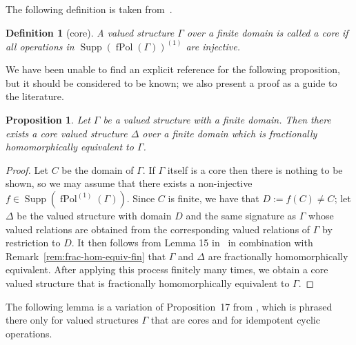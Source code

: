 \documentclass[nonacm]{acmart}
\DeclareMathOperator{\fPol}{fPol}
\DeclareMathOperator{\Sup}{Supp}
\newtheorem{definition}[theorem]{Definition}
\newtheorem{proposition}[theorem]{Proposition}
\begin{document}
The following definition is taken from~\cite{KozikOchremiak15}.
\begin{definition}[core]\label{def:core}
A valued structure $\Gamma$ over a finite domain is called a \emph{core} if all operations in  
$\Sup(\fPol(\Gamma))^{(1)}$ are injective. 
\end{definition}

We have been unable to find an explicit reference for the following proposition, but it should be considered to be known; 
we also present a proof as a guide to the literature. 

\begin{proposition}\label{prop:core}
Let $\Gamma$ be a valued structure with a finite domain. Then there exists a core valued structure $\Delta$ over a finite domain  which is fractionally homomorphically equivalent to $\Gamma$.
\end{proposition}

\begin{proof}
Let $C$ be the domain of $\Gamma$. 
If $\Gamma$ itself is a core then there is nothing to be shown, so we may assume that there exists a non-injective $f \in \Sup(\fPol^{(1)}(\Gamma))$. Since $C$ is finite, we have that $
D := f(C) \neq C$; let $\Delta$ be the valued structure with domain $D$ and the same signature as $\Gamma$ whose valued relations are obtained from the corresponding valued relations of $\Gamma$ by restriction to $D$. 
It then follows from Lemma 15 in~\cite{KozikOchremiak15-arxiv} 
in combination with Remark~\ref{rem:frac-hom-equiv-fin}
that $\Gamma$ and $\Delta$ are fractionally homomorphically equivalent. After applying this process finitely many times, we obtain a core valued structure that is fractionally homomorphically equivalent to $\Gamma$. 
\end{proof}

The following lemma is a variation of Proposition~17 from \cite{KozikOchremiak15}, which is phrased there only for valued structures $\Gamma$ that are cores 
and for idempotent cyclic operations.
\end{document}
